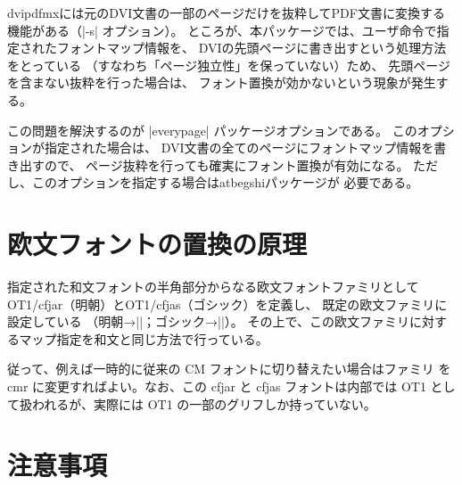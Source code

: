 \documentclass[a4paper,uplatex]{jsarticle}
\newcommand{\Pkg}[1]{\textsf{#1}}
\begin{document}
dvipdfmxには元のDVI文書の一部のページだけを抜粋してPDF文書に変換する
機能がある（|-s| オプション）。
ところが、本パッケージでは、ユーザ命令で指定されたフォントマップ情報を、
DVIの先頭ページに書き出すという処理方法をとっている
（すなわち「ページ独立性」を保っていない）ため、
先頭ページを含まない抜粋を行った場合は、
フォント置換が効かないという現象が発生する。

この問題を解決するのが |everypage| パッケージオプションである。
このオプションが指定された場合は、
DVI文書の全てのページにフォントマップ情報を書き出すので、
ページ抜粋を行っても確実にフォント置換が有効になる。
ただし、このオプションを指定する場合は\Pkg{atbegshi}パッケージが
必要である。

\section{欧文フォントの置換の原理}
\label{sec:Mechanism-Alph}

指定された和文フォントの半角部分からなる欧文フォントファミリとして
OT1/cfjar（明朝）とOT1/cfjas（ゴシック）を定義し、
既定の欧文ファミリに設定している
（明朝→|\rmdefault|；ゴシック→|\sfdefault|）。
その上で、この欧文ファミリに対するマップ指定を和文と同じ方法で行っている。

従って、例えば一時的に従来の CM フォントに切り替えたい場合はファミリ
を cmr に変更すればよい。なお、この cfjar と cfjas フォントは内部では
OT1 として扱われるが、実際には OT1 の一部のグリフしか持っていない。

\section{注意事項}
\end{document}
